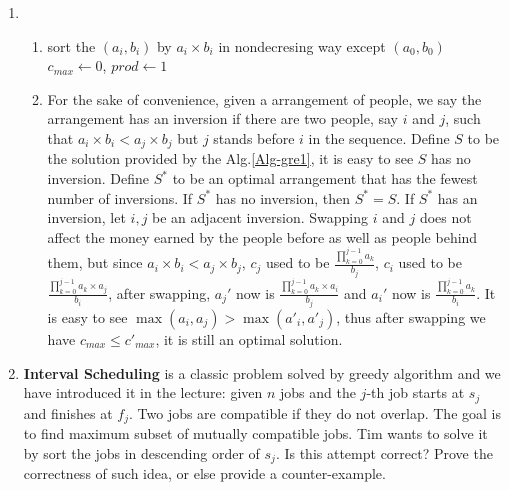 \documentclass[12pt,a4paper]{article}
\makeatletter
\newtheorem*{solution}{Solution}
\theoremstyle{definition}
\renewenvironment{solution}[1][Solution] {\par\pushQED{\qed}\normalfont\topsep6\p@\@plus6\p@\relax\trivlist\item[\hskip\labelsep\bfseries#1\@addpunct{.}]\ignorespaces}{\popQED\endtrivlist\@endpefalse} \makeatother
\makeatother
\begin{document}
\begin{enumerate}
    \begin{solution}
        \begin{enumerate}
        	\item 
        		\begin{minipage}[t]{0.7\textwidth}
        			\centering
        			\begin{algorithm}[H]
        				\BlankLine
        				\caption{$greedy1$} \label{Alg-gre1}
        				sort the $(a_i,b_i)$ by $a_i \times b_i$ in nondecresing way except $(a_0,b_0)$\;
        				$c_{max} \leftarrow 0$, $prod \leftarrow 1$\;
        				\;
        			\end{algorithm}
        		\end{minipage}
        	\item For the sake of convenience, given a arrangement of people, we say the arrangement has an inversion if there are two people, say $i$ and $j$, such that $a_i \times b_i < a_j \times b_j$ but $j$ stands before $i$ in the sequence.
        	Define $S$ to be the solution provided by the Alg.\ref{Alg-gre1}, it is easy to see $S$ has no inversion. Define $S^{*} $ to be an optimal arrangement that has the fewest number of inversions.
        	If $S^{*}$ has no inversion, then $S^{*} = S$. If $S^{*}$ has an inversion, let $i, j$ be an adjacent inversion. Swapping $i$ and $j$ does not affect the money earned by the people before as well as people behind them, but since $a_i \times b_i < a_j \times b_j$, $c_j$ used to be $\frac{\prod_{k=0}^{j-1}a_{k}}{b_j}$, $c_i$ used to be $\frac{\prod_{k=0}^{j-1}a_{k} \times a_j}{b_i}$, after swapping, $a_j'$ now is $\frac{\prod_{k=0}^{j-1}a_{k} \times a_i}{b_j}$ and $a_i'$ now is $\frac{\prod_{k=0}^{j-1}a_{k}}{b_i}$. It is easy to see $\max(a_i,a_j) > \max(a'_i,a'_j)$, thus after swapping we have $c_{max} \leq c'_{max}$, it is still an optimal solution.
        \end{enumerate}
    \end{solution}

    \item
    \textbf{Interval Scheduling} is a classic problem solved by greedy algorithm and we have introduced it in the lecture: given $n$ jobs and the $j$-th job starts at $s_j$ and finishes at $f_j$. Two jobs are compatible if they do not overlap. The goal is to find maximum subset of mutually compatible jobs. Tim wants to solve it by sort the jobs in descending order of $s_j$. Is this attempt correct? Prove the correctness of such idea, or else provide a counter-example.


\end{enumerate}
\end{document}
